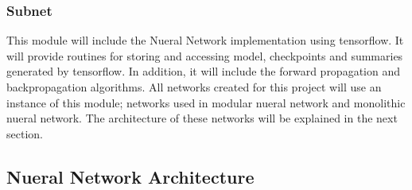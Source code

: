 \documentclass[12pt,a4paper]{article}
\begin{document}
\subsubsection{Subnet}
This module will include the Nueral Network implementation using tensorflow. It will provide routines for storing and accessing model, checkpoints and summaries generated by tensorflow. In addition, it will include the forward propagation and backpropagation algorithms. All networks created for this project will use an instance of this module; networks used in modular nueral network and monolithic nueral network. The architecture of these networks will be explained in the next section.

\subsection{Nueral Network Architecture} \label{modnet}
\end{document}

